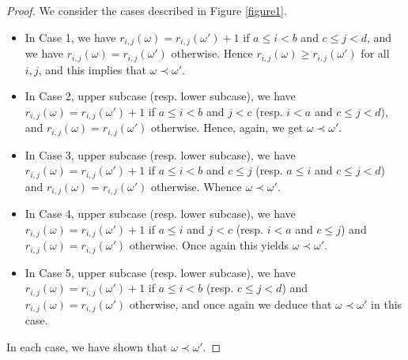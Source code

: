 \documentclass[11pt]{article}
\theoremstyle{definition}
\numberwithin{equation}{section}
\begin{document}
\begin{proof}
We consider the cases described in Figure \ref{figure1}.
\begin{itemize}
\item
In Case 1, we have $r_{i,j}(\omega)=r_{i,j}(\omega')+1$ if $a\leq i<b$ and $c\leq j<d$, and we have $r_{i,j}(\omega)=r_{i,j}(\omega')$ otherwise.
Hence $r_{i,j}(\omega)\geq r_{i,j}(\omega')$ for all $i,j$, and this implies that $\omega\prec\omega'$.
\item In Case 2, upper subcase (resp. lower subcase), we have $r_{i,j}(\omega)=r_{i,j}(\omega')+1$ if $a\leq i<b$ and $j<c$ (resp. $i<a$ and $c\leq j<d$), and $r_{i,j}(\omega)=r_{i,j}(\omega')$ otherwise. Hence, again, we get $\omega\prec\omega'$.
\item In Case 3, upper subcase (resp. lower subcase), we have $r_{i,j}(\omega)=r_{i,j}(\omega')+1$ if $a\leq i<b$ and $c\leq j$ (resp. $a\leq i$ and $c\leq j<d$) and $r_{i,j}(\omega)=r_{i,j}(\omega')$ otherwise. Whence $\omega\prec\omega'$.
\item In Case 4, upper subcase (resp. lower subcase), we have $r_{i,j}(\omega)=r_{i,j}(\omega')+1$ if $a\leq i$ and $j<c$ (resp. $i<a$ and $c\leq j$) and $r_{i,j}(\omega)=r_{i,j}(\omega')$ otherwise. Once again this yields $\omega\prec\omega'$.
\item In Case 5, upper subcase (resp. lower subcase), we have $r_{i,j}(\omega)=r_{i,j}(\omega')+1$ if $a\leq i<b$ (resp. $c\leq j<d$) and $r_{i,j}(\omega)=r_{i,j}(\omega')$ otherwise, and once again we deduce that $\omega\prec\omega'$ in this case.
\end{itemize}
In each case, we have shown that $\omega\prec\omega'$.


\end{proof}
\end{document}
